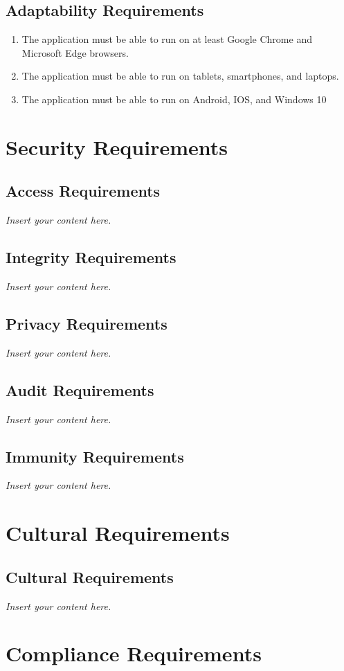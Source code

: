 \documentclass[12pt]{article}
\newcommand{\lips}{\textit{Insert your content here.}}
\begin{document}
\subsection{Adaptability Requirements}
\begin{enumerate} [{MS-ADP}1.]
  \item The application must be able to run on at least Google Chrome and
  Microsoft Edge browsers.
  \item The application must be able to run on tablets, smartphones, and
  laptops.
  \item The application must be able to run on Android, IOS, and Windows 10
\end{enumerate}

\section{Security Requirements}
\subsection{Access Requirements}
\lips
\subsection{Integrity Requirements}
\lips
\subsection{Privacy Requirements}
\lips
\subsection{Audit Requirements}
\lips
\subsection{Immunity Requirements}
\lips

\section{Cultural Requirements}
\subsection{Cultural Requirements}
\lips

\section{Compliance Requirements}
\end{document}
